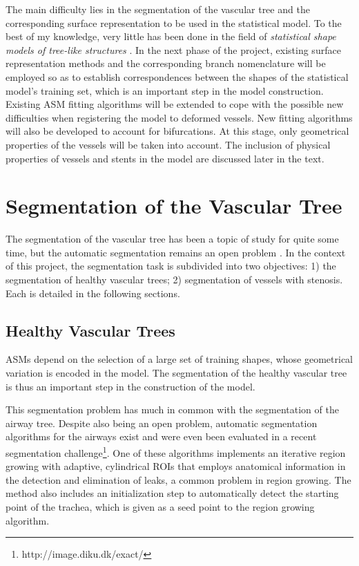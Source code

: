 The main difficulty lies in the segmentation of the vascular tree and the corresponding surface representation to be used in the statistical model. To the best of my knowledge, very little has been done in the field of {\em statistical shape models of tree-like structures} \citep{Feragen2011,Feragen2012}. In the next phase of the project, existing surface representation methods \citep{Florez, Antiga} and the corresponding branch nomenclature will be employed so as to establish correspondences between the shapes of the statistical model's training set, which is an important step in the model construction. Existing ASM fitting algorithms will be extended to cope with the possible new difficulties when registering the model to deformed vessels. New fitting algorithms will also be developed to account for bifurcations. At this stage, only geometrical properties of the vessels will be taken into account. The inclusion of physical properties of vessels and stents in the model are discussed later in the text. 

\section{Segmentation of the Vascular Tree}

The segmentation of the vascular tree has been a topic of study for quite some time, but the automatic segmentation remains an open problem \citep{ORKI-08}. In the context of this project, the segmentation task is subdivided into two objectives: 1) the segmentation of healthy vascular trees; 2) segmentation of vessels with stenosis. Each is detailed in the following sections.

\subsection{Healthy Vascular Trees}

\challenge

ASMs depend on the selection of a large set of training shapes, whose geometrical variation is encoded in the model. The segmentation of the healthy vascular tree is thus an important step in the construction of the model. 

\approach

This segmentation problem has much in common with the segmentation of the airway tree. Despite also being an open problem, automatic segmentation algorithms for the airways exist and were even been evaluated in a recent segmentation challenge\footnote{http://image.diku.dk/exact/}. One of these algorithms \citep{Pinho:Airways2} implements an iterative region growing with adaptive, cylindrical ROIs that employs anatomical information in the detection and elimination of leaks, a common problem in region growing. The method also includes an initialization step to automatically detect the starting point of the trachea, which is given as a seed point to the region growing algorithm. 

